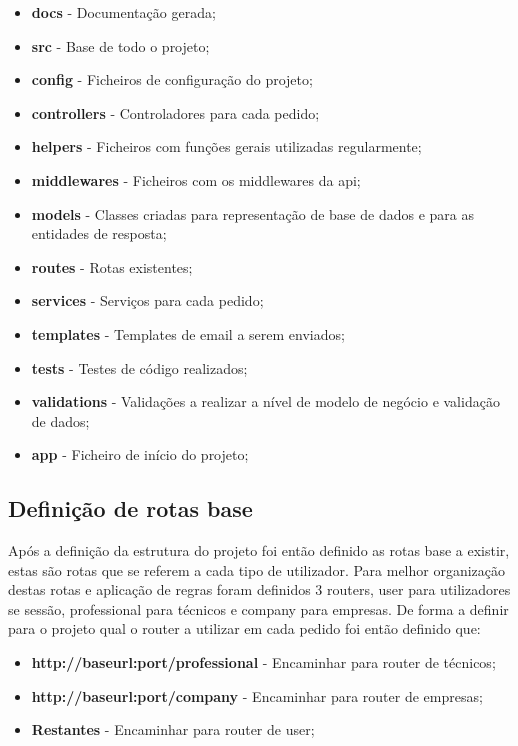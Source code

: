 \begin{itemize}
  \item \textbf{docs} - Documentação gerada;
  \item \textbf{src} - Base de todo o projeto;
  \item \textbf{config} - Ficheiros de configuração do projeto;
  \item \textbf{controllers} - Controladores para cada pedido;
  \item \textbf{helpers} - Ficheiros com funções gerais utilizadas regularmente;
  \item \textbf{middlewares} - Ficheiros com os middlewares da api;
  \item \textbf{models} - Classes criadas para representação de base de dados e para as entidades de resposta;
  \item \textbf{routes} - Rotas existentes;
  \item \textbf{services} - Serviços para cada pedido;
  \item \textbf{templates} - Templates de email a serem enviados;
  \item \textbf{tests} - Testes de código realizados;
  \item \textbf{validations} - Validações a realizar a nível de modelo de negócio e validação de dados;
  \item \textbf{app} - Ficheiro de início do projeto;
\end{itemize}

\subsection{Definição de rotas base}
Após a definição da estrutura do projeto foi então definido as rotas base a existir, estas são rotas
que se referem a cada tipo de utilizador. Para melhor organização destas rotas e aplicação de regras foram definidos 3 routers,
user para utilizadores se sessão, professional para técnicos e company para empresas. De forma a definir para o projeto qual o router a utilizar
em cada pedido foi então definido que:
\begin{itemize}
  \item \textbf{http://baseurl:port/professional} - Encaminhar para router de técnicos;
  \item \textbf{http://baseurl:port/company} - Encaminhar para router de empresas;
  \item \textbf{Restantes} - Encaminhar para router de user;
\end{itemize}

